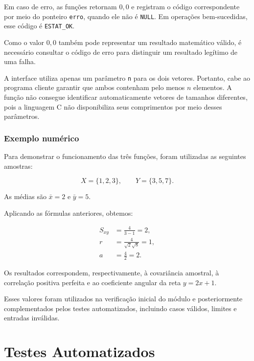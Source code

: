 \documentclass[12pt,a4paper]{article}
\newcommand{\cod}[1]{\texttt{#1}}
\begin{document}
Em caso de erro, as funções retornam $0{,}0$ e registram o código
correspondente por meio do ponteiro \cod{erro}, quando ele não é
\cod{NULL}. Em operações bem-sucedidas, esse código é
\cod{ESTAT\_OK}.

Como o valor $0{,}0$ também pode representar um resultado matemático
válido, é necessário consultar o código de erro para distinguir um
resultado legítimo de uma falha.

A interface utiliza apenas um parâmetro \cod{n} para os dois vetores.
Portanto, cabe ao programa cliente garantir que ambos contenham pelo
menos $n$ elementos. A função não consegue identificar automaticamente
vetores de tamanhos diferentes, pois a linguagem C não disponibiliza
seus comprimentos por meio desses parâmetros.

\subsubsection{Exemplo numérico}

Para demonstrar o funcionamento das três funções, foram utilizadas
as seguintes amostras:

\begin{equation}
X = \{1,2,3\},
\qquad
Y = \{3,5,7\}.
\end{equation}

As médias são $\bar{x}=2$ e $\bar{y}=5$.

Aplicando as fórmulas anteriores, obtemos:

\begin{align}
S_{xy} &= \frac{4}{3-1} = 2,\\
r &= \frac{4}{\sqrt{2}\sqrt{8}} = 1,\\
a &= \frac{4}{2} = 2.
\end{align}

Os resultados correspondem, respectivamente, à covariância amostral,
à correlação positiva perfeita e ao coeficiente angular da reta
$y=2x+1$.

Esses valores foram utilizados na verificação inicial do módulo e
posteriormente complementados pelos testes automatizados, incluindo
casos válidos, limites e entradas inválidas.

\section{Testes Automatizados}
\end{document}
